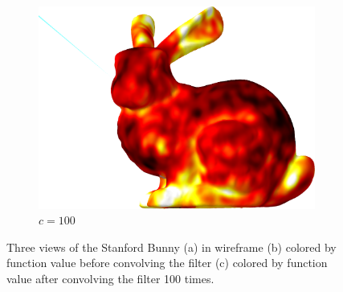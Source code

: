 \begin{figure}[ht]
\begin{subfigure}[b]{0.32\linewidth}
		\includegraphics[width=\linewidth]
		{data/acquired_meshes/bun_zipper_edited_r1_n4_v256_funcvals_100iter.png}
		\caption{$c=100$}\label{fig:bun.c}
	\end{subfigure}
	\caption[Three views of the Stanford Bunny]{Three views of the Stanford Bunny (a) in wireframe (b) colored by function value before convolving the filter (c) colored by function value after convolving the filter 100 times.}
	\label{fig:bun}
\end{figure}
